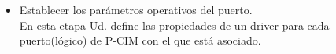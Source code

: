 \begin{itemize}
 \item Establecer los parámetros operativos del puerto.\\
 En esta etapa Ud. define las propiedades de un driver para cada puerto(lógico)
 de P-CIM con el que está asociado.
\end{itemize}

